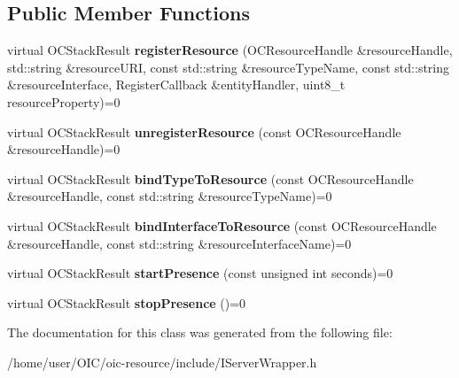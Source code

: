 \subsection*{Public Member Functions}
\begin{DoxyCompactItemize}
\item 
\hypertarget{classOC_1_1IServerWrapper_ab67caca25711a77621f8aeabdfaa1c7e}{}virtual O\+C\+Stack\+Result {\bfseries register\+Resource} (O\+C\+Resource\+Handle \&resource\+Handle, std\+::string \&resource\+U\+R\+I, const std\+::string \&resource\+Type\+Name, const std\+::string \&resource\+Interface, Register\+Callback \&entity\+Handler, uint8\+\_\+t resource\+Property)=0\label{classOC_1_1IServerWrapper_ab67caca25711a77621f8aeabdfaa1c7e}

\item 
\hypertarget{classOC_1_1IServerWrapper_a50a7417ac6b067bf6af5a6fbc8ebbbf1}{}virtual O\+C\+Stack\+Result {\bfseries unregister\+Resource} (const O\+C\+Resource\+Handle \&resource\+Handle)=0\label{classOC_1_1IServerWrapper_a50a7417ac6b067bf6af5a6fbc8ebbbf1}

\item 
\hypertarget{classOC_1_1IServerWrapper_a1a5d48597c547fa1f8121e2436adb86b}{}virtual O\+C\+Stack\+Result {\bfseries bind\+Type\+To\+Resource} (const O\+C\+Resource\+Handle \&resource\+Handle, const std\+::string \&resource\+Type\+Name)=0\label{classOC_1_1IServerWrapper_a1a5d48597c547fa1f8121e2436adb86b}

\item 
\hypertarget{classOC_1_1IServerWrapper_a84ad5609491fb426d464b7906a9b9a68}{}virtual O\+C\+Stack\+Result {\bfseries bind\+Interface\+To\+Resource} (const O\+C\+Resource\+Handle \&resource\+Handle, const std\+::string \&resource\+Interface\+Name)=0\label{classOC_1_1IServerWrapper_a84ad5609491fb426d464b7906a9b9a68}

\item 
\hypertarget{classOC_1_1IServerWrapper_a6715a74f2accdfbb59016c76e921251c}{}virtual O\+C\+Stack\+Result {\bfseries start\+Presence} (const unsigned int seconds)=0\label{classOC_1_1IServerWrapper_a6715a74f2accdfbb59016c76e921251c}

\item 
\hypertarget{classOC_1_1IServerWrapper_a59b965cf7f9d16ec8888c42067084caf}{}virtual O\+C\+Stack\+Result {\bfseries stop\+Presence} ()=0\label{classOC_1_1IServerWrapper_a59b965cf7f9d16ec8888c42067084caf}

\end{DoxyCompactItemize}


The documentation for this class was generated from the following file\+:\begin{DoxyCompactItemize}
\item 
/home/user/\+O\+I\+C/oic-\/resource/include/I\+Server\+Wrapper.\+h\end{DoxyCompactItemize}
